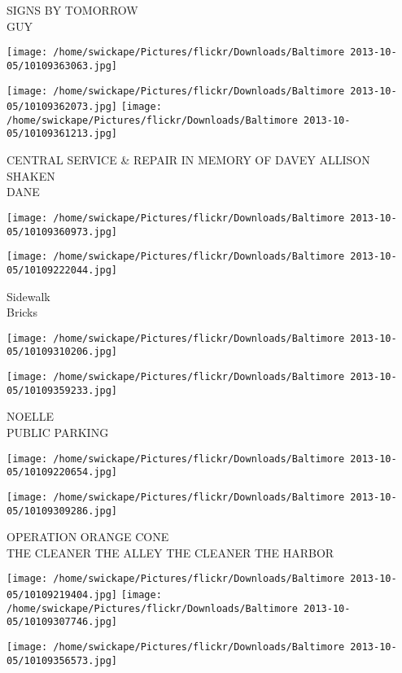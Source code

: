 \documentclass[10pt,letterpaper]{article}
\begin{document}
SIGNS BY TOMORROW\\
GUY
\pagebreak

\texttt{[image: /home/swickape/Pictures/flickr/Downloads/Baltimore 2013-10-05/10109363063.jpg]}

\vspace{0.25in}
\texttt{[image: /home/swickape/Pictures/flickr/Downloads/Baltimore 2013-10-05/10109362073.jpg]}
\texttt{[image: /home/swickape/Pictures/flickr/Downloads/Baltimore 2013-10-05/10109361213.jpg]}

CENTRAL SERVICE \& REPAIR IN MEMORY OF DAVEY ALLISON\\
SHAKEN\\
DANE
\pagebreak

\texttt{[image: /home/swickape/Pictures/flickr/Downloads/Baltimore 2013-10-05/10109360973.jpg]}

\vspace{0.25in}
\texttt{[image: /home/swickape/Pictures/flickr/Downloads/Baltimore 2013-10-05/10109222044.jpg]}

Sidewalk\\
Bricks
\pagebreak

\texttt{[image: /home/swickape/Pictures/flickr/Downloads/Baltimore 2013-10-05/10109310206.jpg]}

\vspace{0.25in}
\texttt{[image: /home/swickape/Pictures/flickr/Downloads/Baltimore 2013-10-05/10109359233.jpg]}

NOELLE\\
PUBLIC PARKING
\pagebreak

\texttt{[image: /home/swickape/Pictures/flickr/Downloads/Baltimore 2013-10-05/10109220654.jpg]}

\vspace{0.25in}
\texttt{[image: /home/swickape/Pictures/flickr/Downloads/Baltimore 2013-10-05/10109309286.jpg]}

OPERATION ORANGE CONE\\
THE CLEANER THE ALLEY THE CLEANER THE HARBOR
\pagebreak

\texttt{[image: /home/swickape/Pictures/flickr/Downloads/Baltimore 2013-10-05/10109219404.jpg]}
\texttt{[image: /home/swickape/Pictures/flickr/Downloads/Baltimore 2013-10-05/10109307746.jpg]}

\vspace{0.25in}
\texttt{[image: /home/swickape/Pictures/flickr/Downloads/Baltimore 2013-10-05/10109356573.jpg]}
\end{document}
